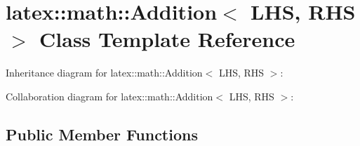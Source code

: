 \hypertarget{classlatex_1_1math_1_1Addition}{\section{latex\-:\-:math\-:\-:\-Addition$<$ \-L\-H\-S, \-R\-H\-S $>$ \-Class \-Template \-Reference}
\label{classlatex_1_1math_1_1Addition}
}


\-Inheritance diagram for latex\-:\-:math\-:\-:\-Addition$<$ \-L\-H\-S, \-R\-H\-S $>$\-:


\-Collaboration diagram for latex\-:\-:math\-:\-:\-Addition$<$ \-L\-H\-S, \-R\-H\-S $>$\-:
\subsection*{\-Public \-Member \-Functions}
